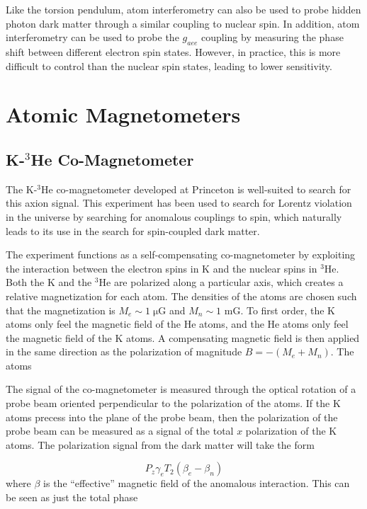 \documentclass[aps,prd,final,letterpaper]{revtex4}
\begin{document}
Like the torsion pendulum, atom interferometry can also be used to probe hidden photon dark matter through a similar coupling to nuclear spin. In addition, atom interferometry can be used to probe the $g_{aee}$ coupling by measuring the phase shift between different electron spin states. However, in practice, this is more difficult to control than the nuclear spin states, leading to lower sensitivity.


\section{Atomic Magnetometers}

\subsection{K-$^{3}$He Co-Magnetometer}

The K-$^{3}$He co-magnetometer developed at Princeton is well-suited to search for this axion signal. This experiment has been used to search for Lorentz violation in the universe by searching for anomalous couplings to spin, which naturally leads to its use in the search for spin-coupled dark matter. 

The experiment functions as a self-compensating co-magnetometer by exploiting the interaction between the electron spins in K and the nuclear spins in $^{3}$He. Both the K and the $^3$He are polarized along a particular axis, which creates a relative magnetization for each atom. The densities of the atoms are chosen such that the magnetization is $M_e \sim 1 \; \mathrm{\mu G}$ and $M_n \sim 1$ mG. To first order, the K atoms only feel the magnetic field of the He atoms, and the He atoms only feel the magnetic field of the K atoms. A compensating magnetic field is then applied in the same direction as the polarization of magnitude $B = -(M_e + M_n)$. The atoms 

The signal of the co-magnetometer is measured through the optical rotation of a probe beam oriented perpendicular to the polarization of the atoms. If the K atoms precess into the plane of the probe beam, then the polarization of the probe beam can be measured as a signal of the total $x$ polarization of the K atoms. The polarization signal from the dark matter will take the form 

\begin{equation}
P_z\gamma_e T_2\left(\beta_e - \beta_n\right)
\end{equation}
where $\beta$ is the ``effective'' magnetic field of the anomalous interaction. This can be seen as just the total phase 
\end{document}
